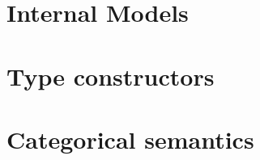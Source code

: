 \documentclass{article}
\begin{document}
\part{Internal Models}\label{part:models}



%

\part{Type constructors}








%

%

%

%

\part{Categorical semantics}









\end{document}
